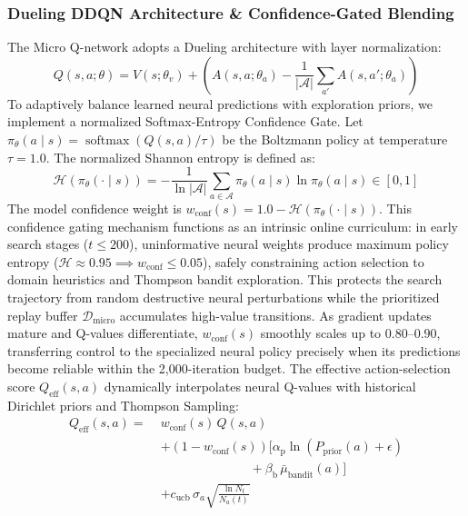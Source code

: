 \documentclass{ieeeaccess}
\begin{document}
\subsubsection{Dueling DDQN Architecture \& Confidence-Gated Blending}
The Micro Q-network adopts a Dueling architecture \cite{wang2016dueling} with layer normalization:
\begin{equation}
  Q(s, a; \theta) = V(s; \theta_v) + \left( A(s, a; \theta_a) - \frac{1}{|\mathcal{A}|} \sum_{a'} A(s, a'; \theta_a) \right)
  \label{eq:dueling_q}
\end{equation}
To adaptively balance learned neural predictions with exploration priors, we implement a normalized Softmax-Entropy Confidence Gate. Let $\pi_{\theta}(a \mid s) = \operatorname{softmax}(Q(s, a)/\tau)$ be the Boltzmann policy at temperature $\tau = 1.0$. The normalized Shannon entropy is defined as:
\begin{equation}
  \mathcal{H}(\pi_{\theta}(\cdot \mid s)) = -\frac{1}{\ln |\mathcal{A}|} \sum_{a \in \mathcal{A}} \pi_{\theta}(a \mid s) \ln \pi_{\theta}(a \mid s) \in [0, 1]
  \label{eq:policy_entropy}
\end{equation}
The model confidence weight is $w_{\text{conf}}(s) = 1.0 - \mathcal{H}(\pi_{\theta}(\cdot \mid s))$. This confidence gating mechanism functions as an intrinsic online curriculum: in early search stages ($t \le 200$), uninformative neural weights produce maximum policy entropy ($\mathcal{H} \approx 0.95 \implies w_{\text{conf}} \le 0.05$), safely constraining action selection to domain heuristics and Thompson bandit exploration. This protects the search trajectory from random destructive neural perturbations while the prioritized replay buffer $\mathcal{D}_{\text{micro}}$ accumulates high-value transitions. As gradient updates mature and Q-values differentiate, $w_{\text{conf}}(s)$ smoothly scales up to $0.80\text{--}0.90$, transferring control to the specialized neural policy precisely when its predictions become reliable within the 2,000-iteration budget. The effective action-selection score $Q_{\text{eff}}(s, a)$ dynamically interpolates neural Q-values with historical Dirichlet priors and Thompson Sampling:
\begin{align}
  Q_{\text{eff}}(s, a) = \; &w_{\text{conf}}(s)\,Q(s, a) \nonumber \\
  &+ (1 - w_{\text{conf}}(s))\Big[ \alpha_{\text{p}}\ln(P_{\text{prior}}(a) + \epsilon) \nonumber \\
  &\qquad\qquad\qquad\quad + \beta_{\text{b}}\,\bar{\mu}_{\text{bandit}}(a) \Big] \nonumber \\
  &+ c_{\text{ucb}}\,\sigma_a \sqrt{\frac{\ln N_t}{N_a(t)}}
  \label{eq:q_eff_blending}
\end{align}
\end{document}

